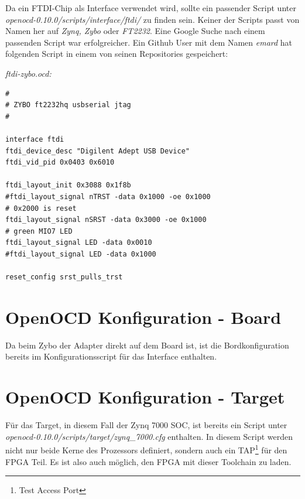 Da ein FTDI-Chip als Interface verwendet wird, sollte ein passender Script unter \textit{openocd-0.10.0/scripts/interface/ftdi/} zu finden sein.
Keiner der Scripts passt von Namen her auf \textit{Zynq, Zybo} oder \textit{FT2232}.
Eine Google Suche nach einem passenden Script war erfolgreicher.
Ein Github User mit dem Namen \textit{emard} hat folgenden Script in einem von seinen Repositories gespeichert:

\textit{ftdi-zybo.ocd:}
\begin{lstlisting}
#
# ZYBO ft2232hq usbserial jtag
#

interface ftdi
ftdi_device_desc "Digilent Adept USB Device"
ftdi_vid_pid 0x0403 0x6010

ftdi_layout_init 0x3088 0x1f8b
#ftdi_layout_signal nTRST -data 0x1000 -oe 0x1000
# 0x2000 is reset
ftdi_layout_signal nSRST -data 0x3000 -oe 0x1000
# green MIO7 LED
ftdi_layout_signal LED -data 0x0010
#ftdi_layout_signal LED -data 0x1000

reset_config srst_pulls_trst

\end{lstlisting}




\section{OpenOCD Konfiguration - Board}
Da beim Zybo der Adapter direkt auf dem Board ist, ist die Bordkonfiguration bereits im Konfigurationsscript für das Interface enthalten.

\section{OpenOCD Konfiguration - Target}
Für das Target, in diesem Fall der Zynq 7000 SOC, ist bereits ein Script unter \textit{openocd-0.10.0/scripts/target/zynq\_7000.cfg} enthalten.
In diesem Script werden nicht nur beide Kerne des Prozessors definiert, sondern auch ein TAP\footnote{Test Access Port} für den FPGA Teil.
Es ist also auch möglich, den FPGA mit dieser Toolchain zu laden.
